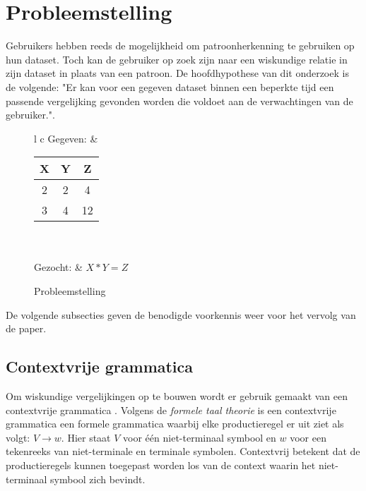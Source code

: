 \documentclass[Main.tex]{subfiles}
\begin{document}
\section{Probleemstelling}
Gebruikers hebben reeds de mogelijkheid om patroonherkenning te gebruiken op hun dataset. Toch kan de gebruiker op zoek zijn naar een wiskundige relatie in zijn dataset in plaats van een patroon. De hoofdhypothese van dit onderzoek is de volgende: "Er kan voor een gegeven dataset binnen een beperkte tijd een passende vergelijking gevonden worden die voldoet aan de verwachtingen van de gebruiker.". 

\begin{figure}[!htb]
\centering
\begin{framed}
\begin{tabular}{l c}
Gegeven: &
\begin{tabular}{| c | c | | c |}
\hline
X & Y & Z \\ \hline
2 & 2 & 4 \\ \hline
3 & 4 &12 \\ \hline
\end{tabular} \\ \\
Gezocht: & $X*Y = Z$
\end{tabular}
\end{framed}
\caption{Probleemstelling}
\label{fig:psvb}
\end{figure}

\par De volgende subsecties geven de benodigde voorkennis weer voor het vervolg van de paper.

 

\subsection{Contextvrije grammatica}
Om wiskundige vergelijkingen op te bouwen wordt er gebruik gemaakt van een contextvrije grammatica \cite{equationDisc}. Volgens de \textit{formele taal theorie} \cite{cfg} is een contextvrije grammatica een formele grammatica waarbij elke productieregel er uit ziet als volgt: $V \rightarrow w$. Hier staat $V$  voor \'e\'en niet-terminaal symbool en $w$ voor een tekenreeks van niet-terminale en terminale symbolen. Contextvrij betekent dat de productieregels kunnen toegepast worden los van de context waarin het niet-terminaal symbool zich bevindt.
\end{document}
